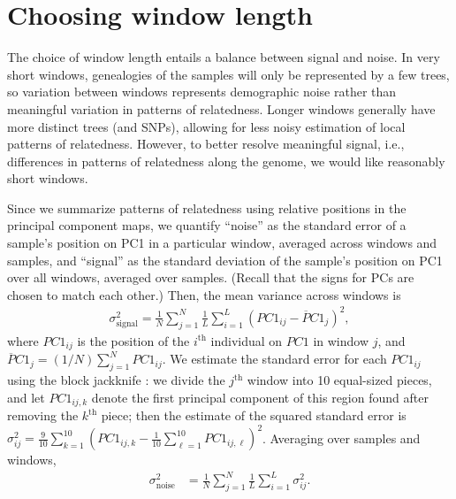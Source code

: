 \documentclass[11pt, oneside]{article}   	%
\newif\ifsubmission
\newcommand\citep{\cite}
\newcommand{\pcone}{PC1}
\begin{document}
\appendix
\setcounter{table}{0}
\renewcommand{\thetable}{S\arabic{table}}
\setcounter{figure}{0}
\renewcommand{\thefigure}{S\arabic{figure}}
\ifsubmission
    \setcounter{postfigure}{0}
    \renewcommand{\thepostfigure}{S\arabic{postfigure}}
\fi

\section{Choosing window length}
\label{apx:window_length}

The choice of window length entails a balance between signal and noise.
In very short windows, genealogies of the samples will only be represented by a few trees,
so variation between windows represents demographic noise rather than meaningful variation in patterns of relatedness.
Longer windows generally have more distinct trees (and SNPs), 
allowing for less noisy estimation of local patterns of relatedness.
However, to better resolve meaningful signal, i.e., differences in patterns of relatedness along the genome,
we would like reasonably short windows.

Since we summarize patterns of relatedness using relative positions in the principal component maps,
we quantify ``noise'' as the standard error of a sample's position on PC1 in a particular window,
averaged across windows and samples,
and ``signal'' as the standard deviation of the sample's position on PC1 over all windows,
averaged over samples.
(Recall that the signs for PCs are chosen to match each other.)
Then, the mean variance across windows is
\begin{align*}
    \sigma_\text{signal}^2
    = 
    \frac{1}{N} \sum_{j=1}^{N}
        \frac{1}{L}\sum_{i=1}^{L}\left ( \pcone_{ij} -\overline\pcone_{j} \right )^{2} ,
\end{align*}
where $\pcone_{ij}$ is the position of the $i^\text{th}$ individual on $\pcone$ in window $j$,
and $\overline\pcone_j = (1/N) \sum_{j=1}^N \pcone_{ij}$.
We estimate the standard error for each $\pcone_{ij}$ using the block jackknife \citep{efron1982jackknife,busing1999deletem}:
we divide the $j^\text{th}$ window into 10 equal-sized pieces,
and let $\pcone_{ij,k}$ denote the first principal component of this region found after removing the $k^\text{th}$ piece;
then the estimate of the squared standard error is
$\sigma^2_{ij} = \frac{9}{10} \sum_{k=1}^{10} ( \pcone_{ij,k} - \frac{1}{10} \sum_{\ell=1}^{10} \pcone_{ij,\ell} )^2$.
Averaging over samples and windows,
\begin{align*}
    \sigma^2_\text{noise}
    &=
    \frac{1}{N} \sum_{j=1}^{N} \frac{1}{L}\sum_{i=1}^{L} \sigma^2_{ij} .
\end{align*}
\end{document}
